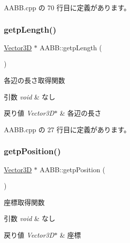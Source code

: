  A\+A\+B\+B.\+cpp の 70 行目に定義があります。

\mbox{\label{class_a_a_b_b_ad86a852594d4a7833b74588937e0c55c}} 
\subsubsection{\texorpdfstring{getp\+Length()}{getpLength()}}
{\footnotesize\ttfamily \mbox{\hyperlink{class_vector3_d}{Vector3D}} $\ast$ A\+A\+B\+B\+::getp\+Length (\begin{DoxyParamCaption}{ }\end{DoxyParamCaption})}



各辺の長さ取得関数 


\begin{DoxyParams}{引数}
{\em void} & なし \\
\hline
\end{DoxyParams}

\begin{DoxyRetVals}{戻り値}
{\em Vector3\+D$\ast$} & 各辺の長さ \\
\hline
\end{DoxyRetVals}


 A\+A\+B\+B.\+cpp の 27 行目に定義があります。

\mbox{\label{class_a_a_b_b_a50913671231f729aff50dcc1f8c68daf}} 
\subsubsection{\texorpdfstring{getp\+Position()}{getpPosition()}}
{\footnotesize\ttfamily \mbox{\hyperlink{class_vector3_d}{Vector3D}} $\ast$ A\+A\+B\+B\+::getp\+Position (\begin{DoxyParamCaption}{ }\end{DoxyParamCaption})}



座標取得関数 


\begin{DoxyParams}{引数}
{\em void} & なし \\
\hline
\end{DoxyParams}

\begin{DoxyRetVals}{戻り値}
{\em Vector3\+D$\ast$} & 座標 \\
\hline
\end{DoxyRetVals}


